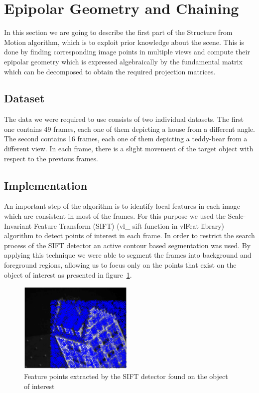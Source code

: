 \section{Epipolar Geometry and Chaining}
\label{egc}
In this section we are going to describe the first part of the Structure from Motion algorithm, which is to exploit prior knowledge about the scene. This is done by finding corresponding image points in multiple views and compute their epipolar geometry which is expressed algebraically by the fundamental matrix which can be decomposed to obtain the required projection matrices.

\subsection{Dataset}
The data we were required to use consists of two individual datasets. The first one contains 49 frames, each one of them depicting a house from a different angle. The second contains 16 frames, each one of them depicting a teddy-bear from a different view. In each frame, there is a slight movement of the target object with respect to the previous frames.

\subsection{Implementation}
An important step of the algorithm is to identify local features in each image which are consistent in most of the frames. For this purpose we used the  Scale-Invariant Feature Transform (SIFT) (vl\_ sift function in vlFeat library) algorithm to detect points of interest in each frame. In order to restrict the search process of the SIFT detector an active contour based segmentation was used. By applying this technique we were able to segment the frames into background and foreground regions, allowing us to focus only on the points that exist on the object of interest as presented in figure~\ref{fig:houseBackground}.

\begin{figure}[ht!]
  \centering
    \includegraphics[width=0.49\textwidth]{figures/houseBackground.eps}
    \caption{Feature points extracted by the SIFT detector found on the object of interest}
    \label{fig:houseBackground}
\end{figure}

